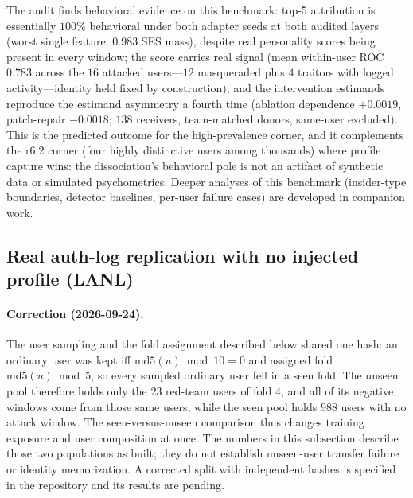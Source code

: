 \documentclass[10pt]{article} %
\newcommand{\rsix}{r6.2}
\begin{document}
The audit finds behavioral evidence on this benchmark: top-5 attribution
is essentially $100\%$ behavioral under both adapter seeds at both audited
layers (worst single feature: $0.983$ SES mass), despite real personality
scores being present in every window; the score carries real signal
(mean within-user ROC $0.783$ across the $16$ attacked users---$12$
masqueraded plus $4$ traitors with logged activity---identity held fixed
by construction); and the intervention estimands reproduce the
estimand asymmetry a fourth time (ablation dependence $+0.0019$,
patch-repair $-0.0018$; $138$ receivers, team-matched donors, same-user
excluded). This is the predicted outcome for the high-prevalence corner,
and it complements the \rsix{} corner (four highly distinctive users among
thousands) where profile capture wins: the dissociation's behavioral pole
is not an artifact of synthetic data or simulated psychometrics. Deeper
analyses of this benchmark (insider-type boundaries, detector baselines,
per-user failure cases) are developed in companion work.

\subsection{Real auth-log replication with no injected profile (LANL)}
\label{sec:lanl}

\paragraph{Correction (2026-09-24).} The user sampling and the fold
assignment described below shared one hash: an ordinary user was kept iff
$\mathrm{md5}(u) \bmod 10 = 0$ and assigned fold $\mathrm{md5}(u) \bmod 5$,
so every sampled ordinary user fell in a seen fold. The unseen pool therefore
holds only the $23$ red-team users of fold $4$, and all of its negative
windows come from those same users, while the seen pool holds $988$ users with
no attack window. The seen-versus-unseen comparison thus changes training
exposure and user composition at once. The numbers in this subsection describe
those two populations as built; they do not establish unseen-user transfer
failure or identity memorization. A corrected split with independent hashes is
specified in the repository and its results are pending.
\end{document}
